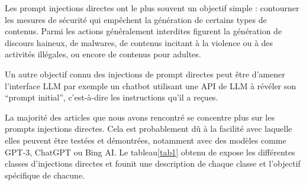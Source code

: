 	Les prompt injections directes ont le plus souvent un objectif simple : contourner les mesures de sécurité qui empêchent la génération de certains types de contenus.
	Parmi les actions généralement interdites figurent la génération de discours haineux, de malwares, de contenus incitant à la violence ou à des activités illégales, ou encore de contenus pour adultes\cite{rossi_early_2024}.
	
	Un autre objectif connu des injections de prompt directes peut être d’amener l’interface LLM par exemple un chatbot utilisant une API de LLM à révéler son “prompt initial”, c’est-à-dire les instructions qu’il a reçues.
	
	La majorité des articles que nous avons rencontré se concentre plus sur les prompts injections directes. Cela est probablement dû à la facilité avec laquelle elles peuvent être testées et démontrées, notamment avec des modèles comme GPT-3, ChatGPT ou Bing AI. Le tableau\ref{tab1} obtenu de \cite{rossi_early_2024} expose les différentes classes d'injections directes et founit une description de chaque classe et l'objectif spécifique de chacune.
